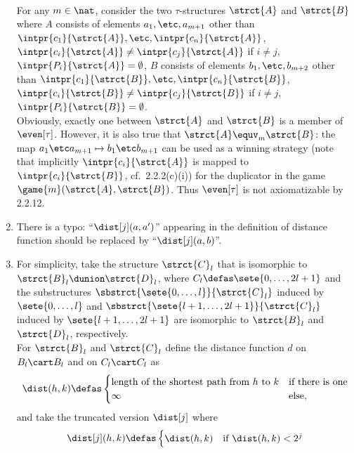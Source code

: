 \begin{enumerate}[1.]
\medskip\\
For any $m \in \nat$, consider the two $\tau$-structures $\strct{A}$ and $\strct{B}$ where $A$ consists of elements $a_1, \etc, a_{m + 1}$ other than $\intpr{c_1}{\strct{A}}, \etc, \intpr{c_n}{\strct{A}}$, $\intpr{c_i}{\strct{A}} \neq \intpr{c_j}{\strct{A}}$ if $i \neq j$, $\intpr{P_i}{\strct{A}} = \emptyset$, $B$ consists of elements $b_1, \etc, b_{m + 2}$ other than $\intpr{c_1}{\strct{B}}, \etc, \intpr{c_n}{\strct{B}}$, $\intpr{c_i}{\strct{B}} \neq \intpr{c_j}{\strct{B}}$ if $i \neq j$, $\intpr{P_i}{\strct{B}} = \emptyset$.
\medskip\\
Obviously, exactly one between $\strct{A}$ and $\strct{B}$ is a member of $\even[\tau]$. However, it is also true that $\strct{A} \equv_m \strct{B}$: the map $a_1 \etc a_{m + 1} \mapsto b_1 \etc b_{m + 1}$ can be used as a winning strategy (note that implicitly $\intpr{c_i}{\strct{A}}$ is mapped to $\intpr{c_i}{\strct{B}}$, cf.\ 2.2.2(c)(i)) for the duplicator in the game $\game{m}(\strct{A}, \strct{B})$. Thus $\even[\tau]$ is not axiomatizable by 2.2.12.
%
\item {} There is a typo: ``$\dist[j](a, a^\prime)$'' appearing in the definition of distance function should be replaced by ``$\dist[j](a, b)$''.
%
\item {} For simplicity, take the structure $\strct{C}_l$ that is isomorphic to $\strct{B}_l \dunion \strct{D}_l$, where $C_l \defas \sete{0, \ldots, 2l + 1}$ and the substructures $\sbstrct{\sete{0, \ldots, l}}{\strct{C}_l}$ induced by $\sete{0, \ldots, l}$ and $\sbstrct{\sete{l + 1, \ldots, 2l + 1}}{\strct{C}_l}$ induced by $\sete{l + 1, \ldots, 2l + 1}$ are isomorphic to $\strct{B}_l$ and $\strct{D}_l$, respectively.
\medskip\\
For $\strct{B}_l$ and $\strct{C}_l$ define the distance function $d$ on $B_l \cart B_l$ and on $C_l \cart C_l$ as
\[
\dist(h, k) \defas
\begin{cases}
\mbox{length of the shortest path from \begin{math}h\end{math} to \begin{math}k\end{math}} & \mbox{if there is one} \cr
\infty & \mbox{else},
\end{cases}
\]
and take the truncated version $\dist[j]$ where
\[
\dist[j](h, k) \defas
\begin{cases}
\dist(h, k) & \mbox{if \begin{math}\dist(h, k) < 2^j\end{math}} \cr

\end{cases}\]
\end{enumerate}
